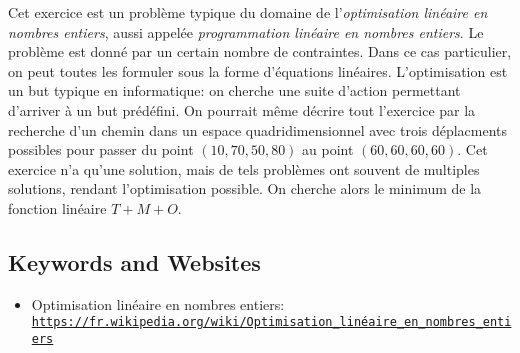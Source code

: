 \documentclass[a4paper,11pt]{report}
\newcommand{\BrochureUrlText}[1]{\texttt{#1}}
\begin{document}
Cet exercice est un problème typique du domaine de l’\emph{optimisation linéaire en nombres entiers}, aussi appelée \emph{programmation linéaire en nombres entiers}. Le problème est donné par un certain nombre de contraintes. Dans ce cas particulier, on peut toutes les formuler sous la forme d’équations linéaires. L’optimisation est un but typique en informatique: on cherche une suite d’action permettant d’arriver à un but prédéfini.
On pourrait même décrire tout l’exercice par la recherche d’un chemin dans un espace quadridimensionnel avec trois déplacments possibles pour passer du point ${(10,70,50,80)}$ au point ${(60,60,60,60)}$. Cet exercice n’a qu’une solution, mais de tels problèmes ont souvent de multiples solutions, rendant l’optimisation possible. On cherche alors le minimum de la fonction linéaire ${T + M + O}$.

{\raggedright

\subsection*{Keywords and Websites}

\begin{itemize}
  \item Optimisation linéaire en nombres entiers: \href{https://fr.wikipedia.org/wiki/Optimisation_lin\%C3\%A9aire_en_nombres_entiers}{\BrochureUrlText{https://fr.wikipedia.org/wiki/Optimisation\_linéaire\_en\_nombres\_entiers}}
\end{itemize}


}
\end{document}

